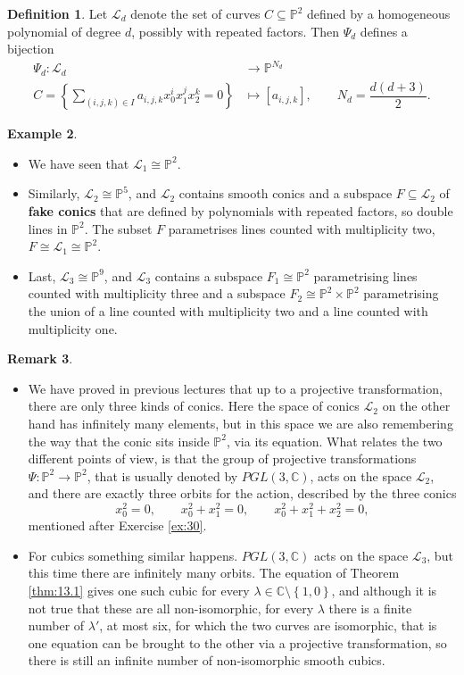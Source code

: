 \documentclass{article}
\newcommand{\C}{\mathbb{C}}
\renewcommand{\P}{\mathbb{P}}
\renewcommand{\L}{\mathcal{L}}
\newcommand{\rb}[1]{\left( #1 \right)}
\renewcommand{\sb}[1]{\left[ #1 \right]}
\newcommand{\cb}[1]{\left\{ #1 \right\}}
\theoremstyle{definition}\newtheorem{definition}{Definition}[section]
\theoremstyle{definition}\newtheorem{notation}[definition]{Notation}
\theoremstyle{definition}\newtheorem{remark}[definition]{Remark}
\theoremstyle{definition}\newtheorem{example1}[definition]{Example}
\theoremstyle{definition}\newtheorem{fact}{Fact}
\theoremstyle{definition}\newtheorem{exercise}{Exercise}
\theoremstyle{definition}\newtheorem*{example2}{Example}
\begin{document}
\begin{definition}
Let $ \L_d $ denote the set of curves $ C \subseteq \P^2 $ defined by a homogeneous polynomial of degree $ d $, possibly with repeated factors. Then $ \Psi_d $ defines a bijection
\begin{align*}
\Psi_d : \L_d & \to \P^{N_d} \\
C = \cb{\sum_{\rb{i, j, k} \in I} a_{i, j, k}x_0^ix_1^jx_2^k = 0} & \mapsto \sb{a_{i, j, k}}, \qquad N_d = \dfrac{d\rb{d + 3}}{2}.
\end{align*}
\end{definition}

\begin{example1}
\hfill
\begin{itemize}
\item We have seen that $ \L_1 \cong \P^2 $.
\item Similarly, $ \L_2 \cong \P^5 $, and $ \L_2 $ contains smooth conics and a subspace $ F \subseteq \L_2 $ of \textbf{fake conics} that are defined by polynomials with repeated factors, so double lines in $ \P^2 $. The subset $ F $ parametrises lines counted with multiplicity two, $ F \cong \L_1 \cong \P^2 $.
\item Last, $ \L_3 \cong \P^9 $, and $ \L_3 $ contains a subspace $ F_1 \cong \P^2 $ parametrising lines counted with multiplicity three and a subspace $ F_2 \cong \P^2 \times \P^2 $ parametrising the union of a line counted with multiplicity two and a line counted with multiplicity one.
\end{itemize}
\end{example1}

\begin{remark}
\hfill
\begin{itemize}
\item We have proved in previous lectures that up to a projective transformation, there are only three kinds of conics. Here the space of conics $ \L_2 $ on the other hand has infinitely many elements, but in this space we are also remembering the way that the conic sits inside $ \P^2 $, via its equation. What relates the two different points of view, is that the group of projective transformations $ \Psi : \P^2 \to \P^2 $, that is usually denoted by $ PGL\rb{3, \C} $, acts on the space $ \L_2 $, and there are exactly three orbits for the action, described by the three conics
$$ x_0^2 = 0, \qquad x_0^2 + x_1^2 = 0, \qquad x_0^2 + x_1^2 + x_2^2 = 0, $$
mentioned after Exercise \ref{ex:30}.
\item For cubics something similar happens. $ PGL\rb{3, \C} $ acts on the space $ \L_3 $, but this time there are infinitely many orbits. The equation of Theorem \ref{thm:13.1} gives one such cubic for every $ \lambda \in \C \setminus \cb{1, 0} $, and although it is not true that these are all non-isomorphic, for every $ \lambda $ there is a finite number of $ \lambda' $, at most six, for which the two curves are isomorphic, that is one equation can be brought to the other via a projective transformation, so there is still an infinite number of non-isomorphic smooth cubics.
\end{itemize}
\end{remark}
\end{document}

